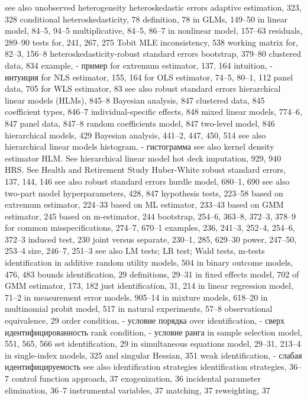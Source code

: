 see also unobserved heterogeneity
heteroskedastic errors
adaptive estimation, 323, 328 conditional heteroskedasticity, 78 definition, 78
in GLMs, 149–50
in linear model, 84–5, 94–5 multiplicative, 84–5, 86–7
in nonlinear model, 157–63 residuals, 289–90
tests for, 241, 267, 275
Tobit MLE inconsistency, 538 working matrix for, 82–3, 156–8
heteroskedasticity-robust standard errors bootstrap, 379–80
clustered data, 834
example, - пример
for extremum estimator, 137, 164 
intuition, - интуиция
for NLS estimator, 155, 164
for OLS estimator, 74–5, 80–1, 112 panel data, 705
for WLS estimator, 83
see also robust standard errors hierarchical linear models (HLMs), 845–8
Bayesian analysis, 847
clustered data, 845
coefficient types, 846–7 individual-specific effects, 848 mixed linear models, 774–6, 847 panel data, 847–8
random coefficients model, 847 two-level model, 846
hierarchical models, 429
Bayesian analysis, 441–2, 447, 450, 514 see also hierarchical linear models
histogram, - гистограмма
see also kernel density estimator
HLM. See hierarchical linear model
hot deck imputation, 929, 940
HRS. See Health and Retirement Study Huber-White robust standard errors, 137, 144, 146
see also robust standard errors hurdle model, 680–1, 690
see also two-part model hyperparameters, 428, 847 hypothesis tests, 223–58
based on extremum estimator, 224–33 based on ML estimator, 233–43
based on GMM estimator, 245
based on m-estimator, 244
bootstrap, 254–6, 363–8, 372–3, 378–9
for common misspecifications, 274–7, 670–1 examples, 236, 241–3, 252–4, 254–6, 372–3 induced test, 230
joint versus separate, 230–1, 285, 629–30 power, 247–50, 253–4
size, 246–7, 251–3
see also LM tests; LR test; Wald tests, m-tests
identification
in additive random utility models, 504
in binary outcome models, 476, 483
bounds identification, 29
definitions, 29–31
in fixed effects model, 702
of GMM estimator, 173, 182
just identification, 31, 214
in linear regression model, 71–2
in measurement error models, 905–14
in mixture models, 618–20
in multinomial probit model, 517
in natural experiments, 57–8
observational equivalence, 29
order condition, - условие порядка
over identification, - сверх идентифицированность
rank condition, - условие ранга
in sample selection model, 551, 565, 566
set identification, 29
in simultaneous equations model, 29–31, 213–4 in single-index models, 325
and singular Hessian, 351
weak identification, - слабая идентифицируемость
see also identification strategies
identification strategies, 36–7
control function approach, 37 exogenization, 36
incidental parameter elimination, 36–7 instrumental variables, 37
matching, 37 reweighting, 37


